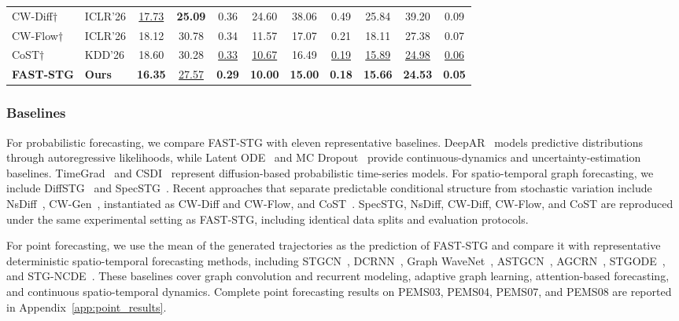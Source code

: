 \documentclass[sigconf, anonymous, review]{acmart}
\begin{document}
\begin{table}[t]
\begin{tabular}{@{}llccccccccc@{}}
CW-Diff$\dagger$~\cite{yang2026cwgen}
& ICLR'26
& \underline{17.73} & \textbf{25.09} & 0.36
& 24.60 & 38.06 & 0.49
& 25.84 & 39.20 & 0.09 \\

CW-Flow$\dagger$~\cite{yang2026cwgen}
& ICLR'26
& 18.12 & 30.78 & 0.34
& 11.57 & 17.07 & 0.21
& 18.11 & 27.38 & 0.07 \\

CoST$\dagger$~\cite{sheng2026cost}
& KDD'26
& 18.60 & 30.28 & \underline{0.33}
& \underline{10.67} & 16.49 & \underline{0.19}
& \underline{15.89} & \underline{24.98} & \underline{0.06} \\

\midrule

\textbf{FAST-STG}
& \textbf{Ours}
& \textbf{16.35} & \underline{27.57} & \textbf{0.29}
& \textbf{10.00} & \textbf{15.00} & \textbf{0.18}
& \textbf{15.66} & \textbf{24.53} & \textbf{0.05} \\

\bottomrule
\end{tabular}
\end{table}

\subsubsection{Baselines}
\label{sec:baselines}

For probabilistic forecasting, we compare FAST-STG with eleven
representative baselines. DeepAR~\cite{salinas2020deepar} models
predictive distributions through autoregressive likelihoods, while
Latent ODE~\cite{rubanova2019latent} and MC
Dropout~\cite{wu2021uncertainty} provide continuous-dynamics and
uncertainty-estimation baselines. TimeGrad~\cite{rasul2021timegrad} and
CSDI~\cite{tashiro2021csdi} represent diffusion-based probabilistic
time-series models. For spatio-temporal graph forecasting, we include
DiffSTG~\cite{wen2023diffstg} and SpecSTG~\cite{lin2025specstg}.
Recent approaches that separate predictable conditional structure from
stochastic variation include NsDiff~\cite{ye2025nsdiff},
CW-Gen~\cite{yang2026cwgen}, instantiated as CW-Diff and CW-Flow, and
CoST~\cite{sheng2026cost}. SpecSTG, NsDiff, CW-Diff, CW-Flow, and CoST
are reproduced under the same experimental setting as FAST-STG,
including identical data splits and evaluation protocols.

For point forecasting, we use the mean of the generated trajectories
as the prediction of FAST-STG and compare it with representative
deterministic spatio-temporal forecasting methods, including
STGCN~\cite{yu2018spatio}, DCRNN~\cite{li2018diffusion},
Graph WaveNet~\cite{wu2019graph}, ASTGCN~\cite{guo2019attention}, AGCRN~\cite{bai2020adaptive}, STGODE~\cite{fang2021stgode}, and
STG-NCDE~\cite{choi2022stgncde}. These baselines cover graph
convolution and recurrent modeling, adaptive graph learning,
attention-based forecasting, and continuous spatio-temporal dynamics.
Complete point forecasting results on PEMS03, PEMS04, PEMS07, and
PEMS08 are reported in Appendix~\ref{app:point_results}.
\end{document}
